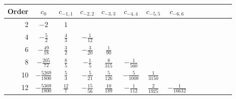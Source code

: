 \begin{tabular}{r|ccccccccccccc}
Order & $c_0$ & $c_{-1, 1}$ & $c_{-2, 2}$ & $c_{-3, 3}$ & $c_{-4, 4}$ & $c_{-5, 5}$ & $c_{-6, 6}$\\[2pt]\hline
2 & $-2$ & $1$ & & & & &\\[4pt]
4 & $- \frac{5}{2}$ & $\frac{4}{3}$ & $- \frac{1}{12}$ & & & &\\[4pt]
6 & $- \frac{49}{18}$ & $\frac{3}{2}$ & $- \frac{3}{20}$ & $\frac{1}{90}$ & & &\\[4pt]
8 & $- \frac{205}{72}$ & $\frac{8}{5}$ & $- \frac{1}{5}$ & $\frac{8}{315}$ & $- \frac{1}{560}$ & &\\[4pt]
10 & $- \frac{5269}{1800}$ & $\frac{5}{3}$ & $- \frac{5}{21}$ & $\frac{5}{126}$ & $- \frac{5}{1008}$ & $\frac{1}{3150}$ &\\[4pt]
12 & $- \frac{5369}{1800}$ & $\frac{12}{7}$ & $- \frac{15}{56}$ & $\frac{10}{189}$ & $- \frac{1}{112}$ & $\frac{2}{1925}$ & $- \frac{1}{16632}$
\end{tabular}
